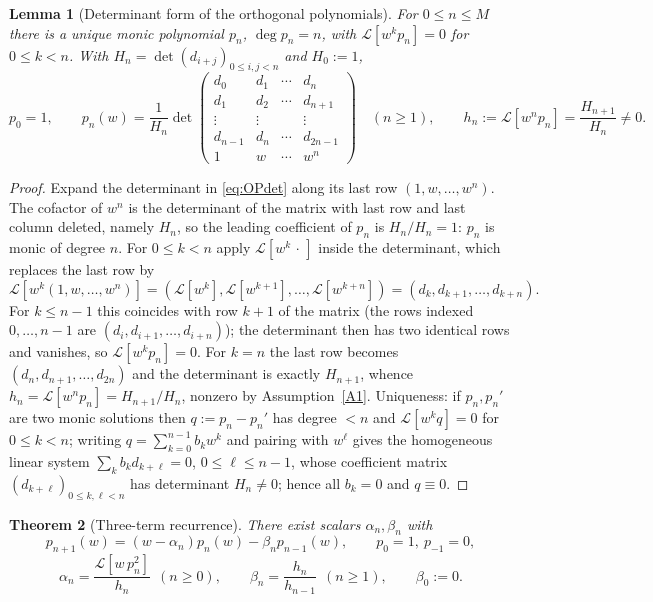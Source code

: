 \documentclass[11pt]{article}
\newtheorem{theorem}{Theorem}[section]
\newtheorem{lemma}[theorem]{Lemma}
\newcommand{\Lc}{\mathcal{L}}
\begin{document}
\begin{lemma}[Determinant form of the orthogonal polynomials]\label{lem:exist}
For $0\le n\le M$ there is a unique monic polynomial $p_n$, $\deg p_n=n$,
with $\Lc[w^{k}p_n]=0$ for $0\le k<n$. With $H_n=\det(d_{i+j})_{0\le i,j<n}$
and $H_0:=1$,
\begin{equation}\label{eq:OPdet}
p_0=1,\qquad
p_n(w)=\frac{1}{H_n}\det\!
\begin{pmatrix}
d_0&d_1&\cdots&d_n\\
d_1&d_2&\cdots&d_{n+1}\\
\vdots&\vdots&&\vdots\\
d_{n-1}&d_n&\cdots&d_{2n-1}\\
1&w&\cdots&w^{n}
\end{pmatrix}
\quad(n\ge1),
\qquad
h_n:=\Lc[w^np_n]=\frac{H_{n+1}}{H_n}\neq0 .
\end{equation}
\end{lemma}

\begin{proof}
Expand the determinant in \eqref{eq:OPdet} along its last row
$(1,w,\dots,w^n)$. The cofactor of $w^n$ is the determinant of the matrix
with last row and last column deleted, namely $H_n$, so the leading
coefficient of $p_n$ is $H_n/H_n=1$: $p_n$ is monic of degree $n$. For
$0\le k<n$ apply $\Lc[w^k\,\cdot\,]$ inside the determinant, which replaces
the last row by
\begin{equation}\label{eq:OP-row}
\Lc\!\left[w^k(1,w,\dots,w^n)\right]
=(\Lc[w^k],\Lc[w^{k+1}],\dots,\Lc[w^{k+n}])
=(d_k,d_{k+1},\dots,d_{k+n}).
\end{equation}
For $k\le n-1$ this coincides with row $k+1$ of the matrix (the rows indexed
$0,\dots,n-1$ are $(d_i,d_{i+1},\dots,d_{i+n})$); the determinant then has
two identical rows and vanishes, so $\Lc[w^kp_n]=0$. For $k=n$ the last row
becomes $(d_n,d_{n+1},\dots,d_{2n})$ and the determinant is exactly
$H_{n+1}$, whence $h_n=\Lc[w^np_n]=H_{n+1}/H_n$, nonzero by
Assumption~\ref{A1}. Uniqueness: if $p_n,p_n'$ are two monic solutions then
$q:=p_n-p_n'$ has degree $<n$ and $\Lc[w^kq]=0$ for $0\le k<n$; writing
$q=\sum_{k=0}^{n-1}b_kw^k$ and pairing with $w^\ell$ gives the homogeneous
linear system $\sum_k b_k d_{k+\ell}=0$, $0\le\ell\le n-1$, whose coefficient
matrix $(d_{k+\ell})_{0\le k,\ell<n}$ has determinant $H_n\neq0$; hence all
$b_k=0$ and $q\equiv0$.
\end{proof}

\begin{theorem}[Three-term recurrence]\label{thm:3term}
There exist scalars $\alpha_n,\beta_n$ with
\begin{equation}\label{eq:3term}
p_{n+1}(w)=(w-\alpha_n)p_n(w)-\beta_n p_{n-1}(w),\qquad p_0=1,\ p_{-1}=0,
\end{equation}
\begin{equation}\label{eq:ab-def}
\alpha_n=\frac{\Lc[w\,p_n^2]}{h_n}\ \ (n\ge0),\qquad
\beta_n=\frac{h_n}{h_{n-1}}\ \ (n\ge1),\qquad \beta_0:=0 .
\end{equation}
\end{theorem}
\end{document}
